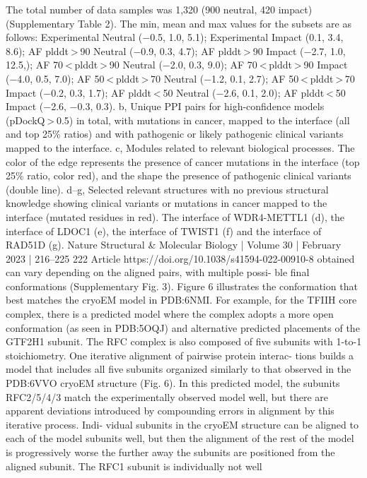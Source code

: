 The total number of data samples was 1,320 (900 neutral, 420 impact)
(Supplementary Table 2). The min, mean and max values for the subsets are
as follows: Experimental Neutral (−0.5, 1.0, 5.1); Experimental Impact (0.1, 3.4,
8.6); AF plddt > 90 Neutral (−0.9, 0.3, 4.7); AF plddt > 90 Impact (−2.7, 1.0, 12.5,);
AF 70 < plddt > 90 Neutral (−2.0, 0.3, 9.0); AF 70 < plddt > 90 Impact (−4.0, 0.5,
7.0); AF 50 < plddt > 70 Neutral (−1.2, 0.1, 2.7); AF 50 < plddt > 70 Impact (−0.2,
0.3, 1.7); AF plddt < 50 Neutral (−2.6, 0.1, 2.0); AF plddt < 50 Impact (−2.6, −0.3,
0.3). b, Unique PPI pairs for high-confidence models (pDockQ > 0.5) in total,
with mutations in cancer, mapped to the interface (all and top 25\% ratios) and
with pathogenic or likely pathogenic clinical variants mapped to the interface.
c, Modules related to relevant biological processes. The color of the edge
represents the presence of cancer mutations in the interface (top 25\% ratio, color
red), and the shape the presence of pathogenic clinical variants (double line).
d–g, Selected relevant structures with no previous structural knowledge showing
clinical variants or mutations in cancer mapped to the interface (mutated
residues in red). The interface of WDR4-METTL1 (d), the interface of LDOC1 (e),
the interface of TWIST1 (f) and the interface of RAD51D (g).
Nature Structural \& Molecular Biology | Volume 30 | February 2023 | 216–225
222
Article
https://doi.org/10.1038/s41594-022-00910-8
obtained can vary depending on the aligned pairs, with multiple possi-
ble final conformations (Supplementary Fig. 3). Figure 6 illustrates the
conformation that best matches the cryoEM model in PDB:6NMI. For
example, for the TFIIH core complex, there is a predicted model where
the complex adopts a more open conformation (as seen in PDB:5OQJ)
and alternative predicted placements of the GTF2H1 subunit.
The RFC complex is also composed of five subunits with 1-to-1
stoichiometry. One iterative alignment of pairwise protein interac-
tions builds a model that includes all five subunits organized similarly
to that observed in the PDB:6VVO cryoEM structure (Fig. 6). In this
predicted model, the subunits RFC2/5/4/3 match the experimentally
observed model well, but there are apparent deviations introduced
by compounding errors in alignment by this iterative process. Indi-
vidual subunits in the cryoEM structure can be aligned to each of the
model subunits well, but then the alignment of the rest of the model
is progressively worse the further away the subunits are positioned
from the aligned subunit. The RFC1 subunit is individually not well
